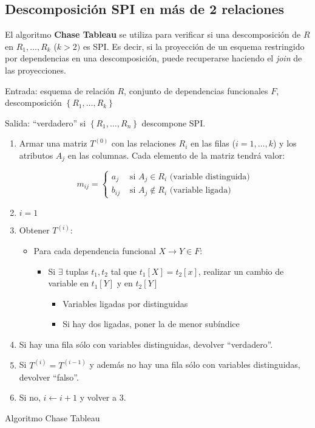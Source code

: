 \documentclass[a4paper, twoside]{article}
\begin{document}
\subsection{Descomposición SPI en más de 2 relaciones}

El algoritmo \textbf{Chase Tableau }se utiliza para verificar si una
descomposición de $R$ en $R_{1},\ldots,R_{k}$ ($k>2)$ es SPI. Es
decir, si la proyección de un esquema restringido por dependencias
en una descomposición, puede recuperarse haciendo el \emph{join} de
las proyecciones.

\begin{algorithm}[H]
Entrada: esquema de relación $R$, conjunto de dependencias funcionales
$F$, descomposición $\left\{ R_{1},\ldots,R_{k}\right\} $

Salida: ``verdadero'' si $\left\{ R_{1},\ldots,R_{n}\right\} $
descompone SPI.
\begin{enumerate}
\item Armar una matriz $T^{(0)}$ con las relaciones $R_{i}$ en las filas
($i=1,\ldots,k$) y los atributos $A_{j}$ en las columnas. Cada elemento
de la matriz tendrá valor:


\[
m_{ij}=\begin{cases}
a_{j} & \text{ si }A_{j}\in R_{i}\text{ (variable distinguida)}\\
b_{ij} & \text{ si }A_{j}\not\in R_{i}\text{ (variable ligada)}
\end{cases}
\]


\item $i=1$
\item Obtener $T^{(i)}$:

\begin{itemize}
\item Para cada dependencia funcional $X\to Y\in F$:

\begin{itemize}
\item Si $\exists$ tuplas $t_{1},t_{2}$ tal que $t_{1}[X]=t_{2}[x]$,
realizar un cambio de variable en $t_{1}[Y]$ y en $t_{2}[Y]$

\begin{itemize}
\item Variables ligadas por distinguidas
\item Si hay dos ligadas, poner la de menor subíndice
\end{itemize}
\end{itemize}
\end{itemize}
\item Si hay una fila sólo con variables distinguidas, devolver ``verdadero''.
\item Si $T^{(i)}=T^{(i-1)}$ y además no hay una fila sólo con variables
distinguidas, devolver ``falso''.
\item Si no, $i\leftarrow i+1$ y volver a 3.
\end{enumerate}
\protect\caption{Algoritmo Chase Tableau}


\end{algorithm}
\end{document}

